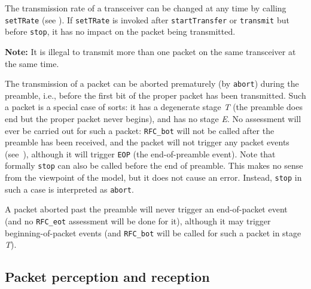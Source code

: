 \medskip

The transmission rate of a transceiver can be changed at any time by calling
{\tt setTRate} (see ).
If {\tt setTRate} is invoked after {\tt startTransfer} or {\tt transmit} but
before {\tt stop}, it has no impact on the packet being transmitted.

\noindent
{\bf Note:}
It is illegal to transmit more than one packet on the same transceiver
at the same time.

The transmission of a packet can be aborted prematurely (by {\tt abort})
during the preamble, i.e., before the first bit of the proper packet has
been transmitted.
Such a packet is a special case of sorts: it has a degenerate stage
{\em T\/} (the preamble does end but
the proper packet never begins),
and has no stage {\em E}.
No assessment will ever be carried out
for such a packet: {\tt RFC\_bot} will not
be called after the preamble has been received, and the packet will not trigger
any packet events (see~), although it will trigger 
{\tt EOP} (the end-of-preamble event).
Note that formally {\tt stop} can also be called before the end of preamble.
This makes no sense from the viewpoint of the model, but it does not cause
an error.
Instead, {\tt stop} in such a case is interpreted as {\tt abort}.

A packet aborted past the preamble will never trigger 
an end-of-packet event (and no {\tt RFC\_eot} assessment will be done for
it), although it may trigger beginning-of-packet events (and {\tt RFC\_bot}
will be called for such a packet in stage {\em T\/}).

\subsection{Packet perception and reception}
\label{rm_tr_pp}

